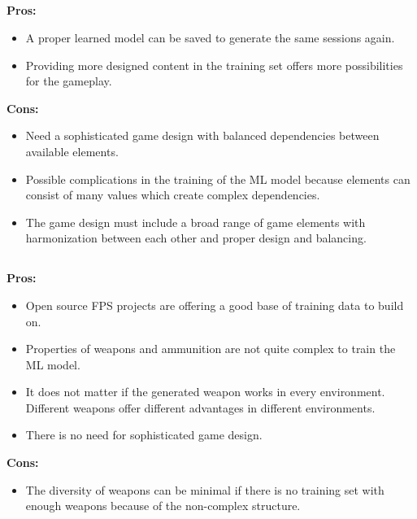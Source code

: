 \documentclass[MGS,Master,english]{twbook}%
\begin{document}
\subsection{}
\textbf{Pros:}
\begin{itemize}
	\item A proper learned model can be saved to generate the same sessions again.
	\item Providing more designed content in the training set offers more possibilities for the gameplay.
\end{itemize}
\textbf{Cons:}
\begin{itemize}
	\item Need a sophisticated game design with balanced dependencies between available elements.
	\item Possible complications in the training of the ML model because elements can consist of many values which create complex dependencies.
	\item The game design must include a broad range of game elements with harmonization between each other and proper design and balancing.
\end{itemize}

\subsection{}
\textbf{Pros:}
\begin{itemize}
	\item Open source FPS projects are offering a good base of training data to build on.
	\item Properties of weapons and ammunition are not quite complex to train the ML model.
	\item It does not matter if the generated weapon works in every environment. Different weapons offer different advantages in different environments.
	\item There is no need for sophisticated game design.
\end{itemize}
\textbf{Cons:}
\begin{itemize}
	\item The diversity of weapons can be minimal if there is no training set with enough weapons because of the non-complex structure.
\end{itemize}
\end{document}
